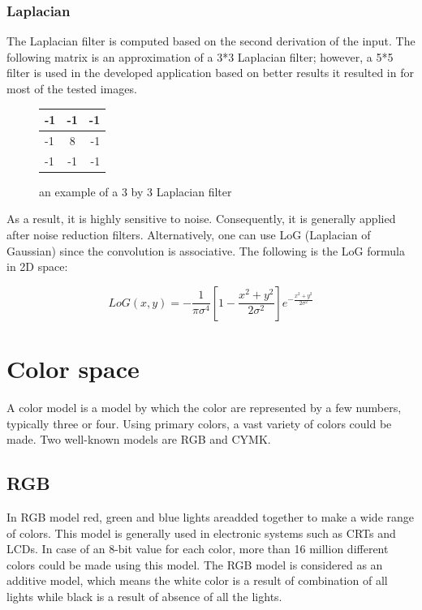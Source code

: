 \documentclass{article}
\begin{document}
		\subsubsection{Laplacian}
			The Laplacian filter is computed based on the second derivation of the input. The following matrix is an approximation of a 3*3 Laplacian filter; however, a 5*5 filter is used in the developed application based on better results it resulted in for
most of the tested images.

\begin{figure}[H]
	\begin{center}
  \begin{tabular}{ | l | c | r | }
    \hline
    -1 & -1 & -1 \\ \hline
    -1 & 8 & -1 \\ \hline
    -1 & -1 & -1 \\
    \hline
  \end{tabular}
\end{center}
\caption{an example of a 3 by 3 Laplacian filter}\end{figure}


			 As a result, it is highly sensitive to noise. Consequently,
			it is generally applied after noise reduction filters. Alternatively, one can use LoG (Laplacian of Gaussian) since the convolution is
			associative. The following is the LoG formula in 2D space:

			\[LoG(x,y) = -\frac{1}{\pi\sigma^{4}}[1-\frac{x^{2}+y^{2}}{2\sigma^{2}}]e^{-\frac{x^{2}+y^{2}}{2\sigma^{2}}}\]

			

\section{Color space}    
	A color model is a model by which the color are represented by a few numbers, typically three or four. Using primary colors, a vast variety of colors could be made. Two well-known models are RGB and CYMK.      

	\subsection{RGB}
		In RGB model red, green and blue lights areadded together to make a wide range of colors. This model is generally used in electronic systems such as CRTs and LCDs. In case of an 8-bit value for each color, more than 16 million different colors
		could be made using this model. The RGB model is considered as an additive model, which means the white color is a result of combination of all lights while black is a result of absence of all the lights.
	
\end{document}
